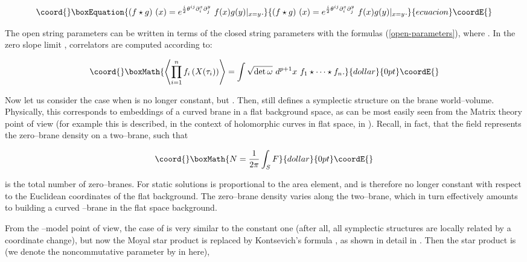 \documentclass[a4paper,11pt]{article}
\begin{document}
\begin{equation}\coord{}\boxEquation{
\left( f\star g\right) \,\left( x\right) =e^{{\frac{i}{2}}\theta
^{ij}\partial _{i}^{x}\partial _{j}^{y}}\ f(x)g(y)|_{x=y}.
}{
\left( f\star g\right) \,\left( x\right) =e^{{\frac{i}{2}}\theta
^{ij}\partial _{i}^{x}\partial _{j}^{y}}\ f(x)g(y)|_{x=y}.
}{ecuacion}\coordE{}\end{equation}

\noindent 
The open string parameters can be written in terms of the closed string
parameters with the formulas (\ref{open-parameters}), where \coordHE{}. In the zero slope limit \cite {Seiberg-Witten},
correlators are computed according to:

$$\coord{}\boxMath{
\left\langle \prod_{i=1}^{n} f_{i} \left( X(\tau_{i}) \right) \right\rangle
= \int \sqrt{\det \omega}\ d^{p+1}x\ f_{1} \star \cdots \star f_{n}.
}{dollar}{0pt}\coordE{}$$

Now let us consider the case when \coordHE{} is no longer
constant, but \coordHE{}. Then, \myHighlight{$\omega $}\coordHE{} still defines a symplectic
structure on the brane world--volume. Physically, this corresponds to
embeddings of a curved brane in a flat background space, as can be most
easily seen from the Matrix theory point of view (for example this is
described, in the context of holomorphic curves in flat space, in
\cite{Cornalba-Taylor, Cornalba-1}). Recall, in fact, that the \coordHE{} field
represents the zero--brane density on a two--brane, such that

$$\coord{}\boxMath{
N = {\frac{1}{2\pi}} \int_{S} F
}{dollar}{0pt}\coordE{}$$

\noindent 
is the total number of zero--branes. For static solutions \coordHE{} is
proportional to the area element, and is therefore no longer constant with
respect to the Euclidean coordinates of the flat background. The
zero--brane density varies along the two--brane, which in turn effectively
amounts to building a curved \coordHE{}--brane in the flat space background.

From the \myHighlight{$\sigma$}\coordHE{}--model point of view, the case of \coordHE{} is very
similar to the constant one (after all, all symplectic structures are
locally related by a coordinate change), but now the Moyal star product is
replaced by Kontsevich's formula \cite{Kontsevich}, as shown in detail in
\cite{Cattaneo-Felder}. Then the star product is (we denote the
noncommutative parameter by \coordHE{} in here),
\end{document}
